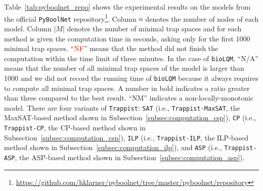 \documentclass[preprint,12pt]{elsarticle}
\newcommand{\change}[1]{\textcolor{red}{#1}}
\begin{document}
Table~\ref{tab:pyboolnet_repo} shows the experimental results on the models from the official \texttt{PyBoolNet} repository\footnote{\url{https://github.com/hklarner/pyboolnet/tree/master/pyboolnet/repository}}.
Column \(n\) denotes the number of nodes of each model.
Column \(|M|\) denotes the number of minimal trap spaces and for each method is given the computation time in seconds, asking only for the first 1000 minimal trap spaces.
``\change{NF}'' means that the method did not finish the computation within the time limit of three minutes.
In the case of \texttt{bioLQM}, ``N/A'' means that the number of all minimal trap spaces of the model is larger than 1000 and we did not record the running time of \texttt{bioLQM} because it always requires to compute all minimal trap spaces.
A number in bold indicates a ratio greater than three compared to the best result.
``NM'' indicates a non-locally-monotonic model.
There are four variants of \texttt{Trappist}: \texttt{SAT} (i.e., \texttt{Trappist-MaxSAT}, the MaxSAT-based method shown in Subsection~\ref{subsec:computation_csp}), \texttt{CP} (i.e., \texttt{Trappist-CP}, the CP-based method shown in Subsection~\ref{subsec:computation_csp}), \texttt{ILP} (i.e., \texttt{Trappist-ILP}, the ILP-based method shown in Subsection~\ref{subsec:computation_ilp}), and \texttt{ASP} (i.e., \texttt{Trappist-ASP}, the ASP-based method shown in Subsection~\ref{subsec:computation_asp}).
\end{document}
